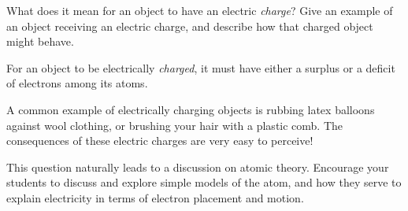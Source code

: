 

What does it mean for an object to have an electric {\it charge}?  Give an example of an object receiving an electric charge, and describe how that charged object might behave.







For an object to be electrically {\it charged}, it must have either a surplus or a deficit of electrons among its atoms.  

A common example of electrically charging objects is rubbing latex balloons against wool clothing, or brushing your hair with a plastic comb.  The consequences of these electric charges are very easy to perceive!







This question naturally leads to a discussion on atomic theory.  Encourage your students to discuss and explore simple models of the atom, and how they serve to explain electricity in terms of electron placement and motion.




